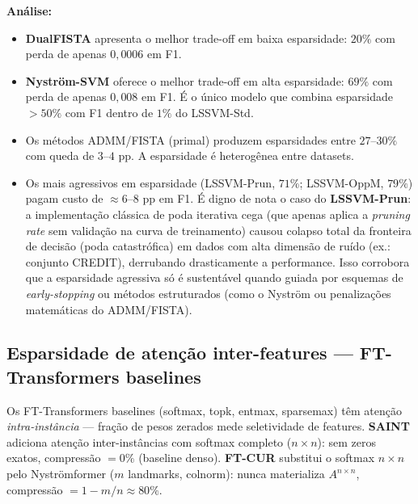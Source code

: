 \documentclass[12pt,a4paper]{article}
\begin{document}
\textbf{Análise:}
\begin{itemize}
  \item \textbf{DualFISTA} apresenta o melhor trade-off em baixa esparsidade:
        $20\%$ com perda de apenas $0{,}0006$ em F1.
  \item \textbf{Nyström-SVM} oferece o melhor trade-off em alta esparsidade:
        $69\%$ com perda de apenas $0{,}008$ em F1. É o único modelo que combina
        esparsidade $>50\%$ com F1 dentro de $1\%$ do LSSVM-Std.
  \item Os métodos ADMM/FISTA (primal) produzem esparsidades entre $27$--$30\%$
        com queda de $3$--$4$ pp. A esparsidade é heterogênea entre datasets.
  \item Os mais agressivos em esparsidade (LSSVM-Prun, $71\%$; LSSVM-OppM, $79\%$)
        pagam custo de $\approx 6$--$8$ pp em F1. É digno de nota o caso do \textbf{LSSVM-Prun}: a implementação clássica de poda iterativa cega (que apenas aplica a \textit{pruning rate} sem validação na curva de treinamento) causou colapso total da fronteira de decisão (poda catastrófica) em dados com alta dimensão de ruído (ex.: conjunto CREDIT), derrubando drasticamente a performance. Isso corrobora que a esparsidade agressiva só é sustentável quando guiada por esquemas de \textit{early-stopping} ou métodos estruturados (como o Nyström ou penalizações matemáticas do ADMM/FISTA).
\end{itemize}

\subsection{Esparsidade de atenção inter-features — FT-Transformers baselines}

\begin{tcolorbox}[colback=fixbg, colframe=fixborder, fonttitle=\bfseries,
  title=\textbf{Nota: esparsidade inter-features vs.\ compressão inter-instâncias}]
Os FT-Transformers baselines (softmax, topk, entmax, sparsemax) têm atenção
\emph{intra-instância} --- fração de pesos zerados mede seletividade de features.
\textbf{SAINT} adiciona atenção inter-instâncias com softmax completo ($n \times n$):
sem zeros exatos, compressão $= 0\%$ (baseline denso). \textbf{FT-CUR} substitui
o softmax $n \times n$ pelo Nyströmformer ($m$ landmarks, colnorm): nunca
materializa $A^{n \times n}$, compressão $= 1 - m/n \approx 80\%$.
\end{tcolorbox}
\end{document}
